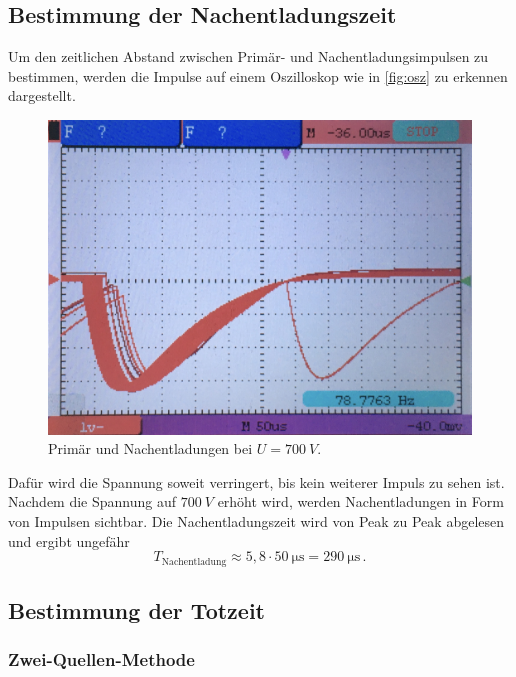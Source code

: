 \subsection{Bestimmung der Nachentladungszeit}

Um den zeitlichen Abstand zwischen Primär- und Nachentladungsimpulsen zu bestimmen,
werden die Impulse auf einem Oszilloskop wie in \autoref{fig:osz} zu erkennen dargestellt.
\begin{figure}
    \centering
    \includegraphics[width = 0.8\linewidth]{pictures/osz.jpg}
    \caption{Primär und Nachentladungen bei $U = \qty{700}{V}$.}
    \label{fig:osz}
\end{figure}

Dafür wird die Spannung soweit verringert, bis kein weiterer Impuls zu sehen ist.
Nachdem die Spannung auf $\qty{700}{V}$ erhöht wird, werden Nachentladungen in Form von Impulsen sichtbar.
Die Nachentladungszeit wird von Peak zu Peak abgelesen und ergibt ungefähr
\begin{equation*}
    T_\text{Nachentladung} \approx 5,8 \cdot \qty{50}{\micro\second} = \qty{290}{\micro\second} \, .
\end{equation*}


\subsection{Bestimmung der Totzeit}

\subsubsection*{Zwei-Quellen-Methode}

